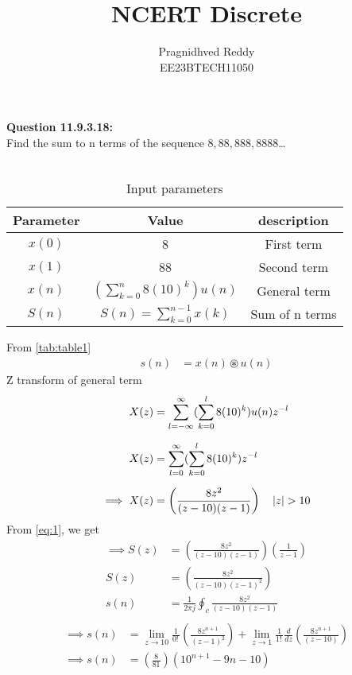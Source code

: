 \documentclass[journal,12pt,twocolumn]{IEEEtran}
\title{NCERT Discrete}
\author{Pragnidhved Reddy\\EE23BTECH11050}
\date{}
\begin{document}
\maketitle
\newpage
\bigskip
\textbf{Question 11.9.3.18:}\\
 Find the sum to n terms of the sequence $8,88,888,8888$\ldots\\
 \solution \\
 \begin{table}[H]
\centering
\setlength{\extrarowheight}{8pt}
\begin{tabular}{|c|c|c|}\hline
\textbf{Parameter} & \textbf{Value} & \textbf{description}\\ \hline
$x(0)$ & 8 & First term \\ \hline
$x(1)$ & 88 & Second term \\ \hline 
$x(n)$ & $(\sum^{n}_{k=0}8(10)^k)u(n)$ & General term \\ \hline
$S(n)$ & $S(n)=\sum^{n-1}_{k=0}x(k)$ & Sum of n terms \\ \hline
\end{tabular}
\caption{Input parameters}
\label{tab:table1}
\end{table}
 From \eqref{tab:table1}
\begin{align}
\label{eq:1}
 s(n)&=x(n)\circledast u(n)
 \end{align}
 Z transform of general term
 \begin{align}
 X(z)&=\sum_{l=-\infty}^{\infty}(\sum_{k=0}^{l}8(10)^k)u(n)z^{-l}\\[6pt]
 X(z)&=\sum_{l=0}^{\infty}(\sum_{k=0}^{l}8(10)^k)z^{-l}\\[6pt]
 \implies X(z)&=\left(\frac{8z^2}{(z-10)(z-1)}\right) \quad \left\vert z\right\vert>10
\end{align}
From \eqref{eq:1}, we get
 \begin{align}
 \label{eq:6}
 \implies S(z)&=\left(\frac{8z^2}{(z-10)(z-1)}\right)\left(\frac{1}{z-1}\right)\\[6pt]
 S(z)&=\left(\frac{8z^2}{(z-10)(z-1)^2}\right)\\[6pt]
 s(n)&=\frac{1}{2\pi j}\oint_{c}\frac{8z^2}{(z-10)(z-1)}\\[6pt]
 \end{align}
 \begin{align}
\implies s(n)&=\lim_{z\to10}\frac{1}{0\displaystyle !\,}\left(\frac{8z^{n+1}}{(z-1)^2}\right)+\lim_{z\to1}\frac{1}{1\displaystyle !\,}\frac{d}{dz}\left(\frac{8z^{n+1}}{(z-10)}\right)\\
\implies s(n)&=\left(\frac{8}{81}\right)(10^{n+1}-9n-10)   
\end{align}
 
\end{document}
